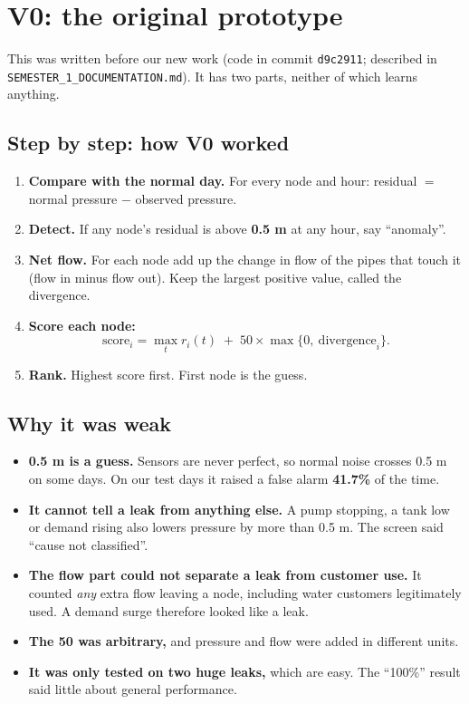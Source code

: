\documentclass[11pt,a4paper]{article}
\newcommand{\code}[1]{\texttt{#1}}
\begin{document}
\section{V0: the original prototype}
This was written before our new work (code in commit \code{d9c2911}; described in \code{SEMESTER\_1\_DOCUMENTATION.md}). It has two parts, neither of which learns anything.

\subsection{Step by step: how V0 worked}
\begin{enumerate}
\item \textbf{Compare with the normal day.} For every node and hour: residual $=$ normal pressure $-$ observed pressure.
\item \textbf{Detect.} If any node's residual is above \textbf{0.5 m} at any hour, say ``anomaly''.
\item \textbf{Net flow.} For each node add up the change in flow of the pipes that touch it (flow in minus flow out). Keep the largest positive value, called the divergence.
\item \textbf{Score each node:}
\[\text{score}_i=\max_t r_i(t)\;+\;50\times\max\{0,\ \text{divergence}_i\}.\]
\item \textbf{Rank.} Highest score first. First node is the guess.
\end{enumerate}

\subsection{Why it was weak}
\begin{itemize}
\item \textbf{0.5 m is a guess.} Sensors are never perfect, so normal noise crosses 0.5 m on some days. On our test days it raised a false alarm \textbf{41.7\%} of the time.
\item \textbf{It cannot tell a leak from anything else.} A pump stopping, a tank low or demand rising also lowers pressure by more than 0.5 m. The screen said ``cause not classified''.
\item \textbf{The flow part could not separate a leak from customer use.} It counted \emph{any} extra flow leaving a node, including water customers legitimately used. A demand surge therefore looked like a leak.
\item \textbf{The 50 was arbitrary,} and pressure and flow were added in different units.
\item \textbf{It was only tested on two huge leaks,} which are easy. The ``100\%'' result said little about general performance.
\end{itemize}
\end{document}
